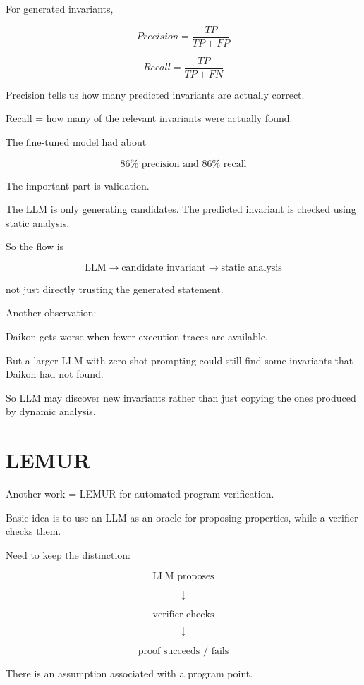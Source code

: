 \documentclass[11pt]{book}
\begin{document}
For generated invariants,

\[
Precision = \frac{TP}{TP+FP}
\]

\[
Recall = \frac{TP}{TP+FN}
\]

Precision tells us how many predicted invariants
are actually correct.

Recall = how many of the relevant invariants were
actually found.

The fine-tuned model had about

\[
86\% \text{ precision and } 86\% \text{ recall}
\]

\begin{ppkey}
The important part is validation.

The LLM is only generating candidates.
The predicted invariant is checked using static analysis.
\end{ppkey}

So the flow is

\[
\text{LLM}
\rightarrow
\text{candidate invariant}
\rightarrow
\text{static analysis}
\]

not just directly trusting the generated statement.

Another observation:

Daikon gets worse when fewer execution traces
are available.

But a larger LLM with zero-shot prompting could
still find some invariants that Daikon had not found.

So LLM may discover new invariants rather than
just copying the ones produced by dynamic analysis.

\section{LEMUR}

Another work = LEMUR for automated program verification.

Basic idea is to use an LLM as an oracle for proposing
properties, while a verifier checks them.

Need to keep the distinction:

\[
\text{LLM proposes}
\]

\[
\downarrow
\]

\[
\text{verifier checks}
\]

\[
\downarrow
\]

\[
\text{proof succeeds / fails}
\]

There is an assumption associated with a program point.
\end{document}
